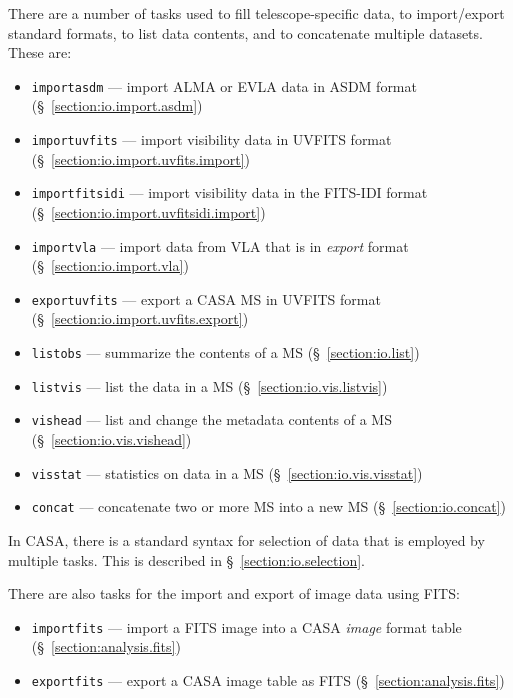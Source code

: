 There are a number of tasks used to fill telescope-specific data,
to import/export standard formats, to list data contents, and
to concatenate multiple datasets.  These are:
\begin{itemize}
   \item {\tt importasdm} --- import ALMA or EVLA data in ASDM format 
         (\S~\ref{section:io.import.asdm})
   \item {\tt importuvfits} --- import visibility data in UVFITS
         format (\S~\ref{section:io.import.uvfits.import})
   \item {\tt importfitsidi} --- import visibility data in the
     FITS-IDI format (\S~\ref{section:io.import.uvfitsidi.import})
   \item {\tt importvla} --- import data from VLA that is in 
         {\it export} format (\S~\ref{section:io.import.vla})
   \item {\tt exportuvfits} --- export a CASA MS in UVFITS format 
         (\S~\ref{section:io.import.uvfits.export})
   \item {\tt listobs} --- summarize the contents of a MS 
         (\S~\ref{section:io.list})
   \item {\tt listvis} --- list the data in a MS 
         (\S~\ref{section:io.vis.listvis})
   \item {\tt vishead} --- list and change the metadata contents of a MS 
         (\S~\ref{section:io.vis.vishead})
   \item {\tt visstat} --- statistics on data in a MS 
         (\S~\ref{section:io.vis.visstat})
   \item {\tt concat} --- concatenate two or more MS into a
         new MS (\S~\ref{section:io.concat})
\end{itemize}

In CASA, there is a standard syntax for selection of data that
is employed by multiple tasks.  
This is described in \S~\ref{section:io.selection}.

There are also tasks for the import and export of image data using
FITS:
\begin{itemize}
   \item {\tt importfits} --- import a FITS image into a CASA  
         {\it image} format table 
         (\S~\ref{section:analysis.fits})
   \item {\tt exportfits} --- export a CASA image table as FITS 
         (\S~\ref{section:analysis.fits})
\end{itemize}

